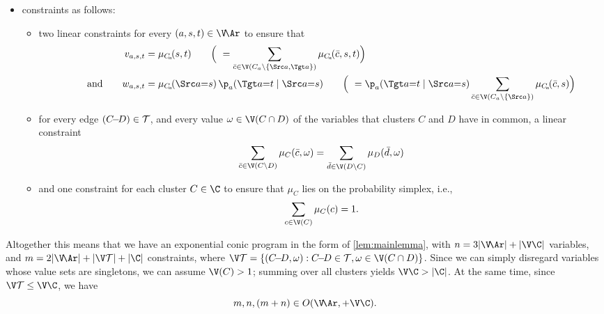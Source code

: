 \begin{lproof}
\begin{itemize}[label=$\blacktriangleright$]
    \item constraints as follows:
        \begin{itemize}[label=\textbullet]
            \item 
            two linear constraints for every $(a,s,t) \in \V\!\Ar$ to ensure that
            \begin{align*}
                v_{a,s,t} &= \mu_{C_{\!a}}\!(s,t)
                    \qquad\Big(~= \sum_{\bar c \in \V(C_a \setminus\{\Src a, \Tgt a\})}
                        \mu_{C_{\!a}}\!(\bar c, s, t) \Big) \\
                \qquad\text{and}\qquad
                w_{a,s,t} &= \mu_{C_{\!a}}\!(\Src a{=}s)\, \p_a(\Tgt a{=}t\mid\Src a{=}s)
                    \qquad\Big(~= \p_a(\Tgt a{=}t\mid\Src a{=}s) \sum_{\bar c \in \V(C_a \setminus\{\Src a\})}
                        \mu_{C_{\!a}}\!(\bar c, s) \Big)
            \end{align*}
            \item for every edge $(C\!{-}\!D) \in \cal T$, and every value $\omega \in \V(C \cap D)$ of the variables that clusters $C$ and $D$ have in common, a linear constraint
            \[
                \sum_{\bar c \in \V(C\setminus D)} \mu_C(\bar c, \omega) 
                    =
                \sum_{\bar d \in \V(D \setminus C)} \mu_D(\bar d, \omega)
            \]
            \item and one constraint for each cluster $C \in \C$ to ensure that $\mu_{C}$ lies on the probability simplex, i.e.,
            \[
                \sum_{c \in \V(C)} \mu_C(c) = 1.
            \]     
        \end{itemize}
    \end{itemize}
    
    Altogether this means that we have an exponential conic program in the form
    of \cref{lem:mainlemma}, with
        $n = 3|\V\!\Ar| + |\V\C|$ variables,
        and
        $m = 2 |\V\!\Ar| + |\V \mathcal T| +  |\C|$ constraints,
    where
    $\V\mathcal T = \{ (C\!{-}\!D, \omega) :  C\!{-}\!D \in \mathcal T, \omega \in \V(C\cap D)\}$.
    Since we can simply disregard variables whose value sets are singletons, we can assume $\V(C) > 1$; summing over all clusters yields $\V\C > |\C|$. 
    At the same time, since $\V\mathcal T \le \V\C$, 
    we have 
    \[ m,n,(m + n) \in O(\V\!\Ar, + \V\C).  \]


\end{lproof}
